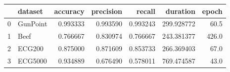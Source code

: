 \begin{tabular}{llrrrrr}
\toprule
{} &   dataset &  accuracy &  precision &    recall &    duration &  epoch \\
\midrule
0 &  GunPoint &  0.993333 &   0.993590 &  0.993243 &  299.928772 &   60.5 \\
1 &      Beef &  0.766667 &   0.830974 &  0.766667 &  243.381377 &  426.0 \\
2 &    ECG200 &  0.875000 &   0.871609 &  0.853733 &  266.369403 &   67.0 \\
3 &   ECG5000 &  0.934889 &   0.676490 &  0.578011 &  769.474587 &   43.0 \\
\bottomrule
\end{tabular}
